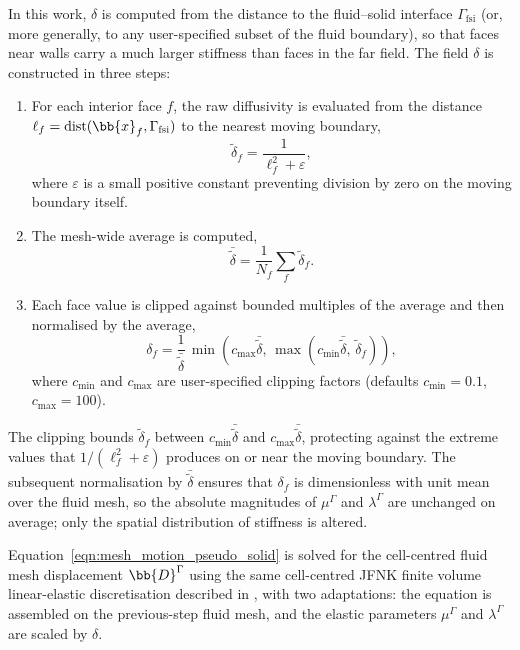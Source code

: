 In this work, $\delta$ is computed from the distance to the fluid--solid interface $\Gamma_\mathrm{fsi}$ (or, more generally, to any user-specified subset of the fluid boundary), so that faces near walls carry a much larger stiffness than faces in the far field.
The field $\delta$ is constructed in three steps:
\begin{enumerate}
    \item For each interior face $f$, the raw diffusivity is evaluated from the distance $\ell_f = \mathrm{dist}(\bb{x}_f, \Gamma_\mathrm{fsi})$ to the nearest moving boundary,
    \begin{equation}
        \tilde{\delta}_f = \frac{1}{\ell_f^2 + \varepsilon},
        \label{qm:eqn:mesh_motion_diffusivity_raw}
    \end{equation}
    where $\varepsilon$ is a small positive constant preventing division by zero on the moving boundary itself.

    \item The mesh-wide average is computed,
    \begin{equation}
        \bar{\tilde\delta} = \frac{1}{N_f}\sum_f \tilde\delta_f .
        \label{qm:eqn:delta_average}
    \end{equation}

    \item Each face value is clipped against bounded multiples of the average and then normalised by the average,
    \begin{equation}
        \delta_f = \frac{1}{\bar{\tilde\delta}}\,\min\!\left(c_\text{max}\bar{\tilde\delta},\, \max\!\left(c_\text{min}\bar{\tilde\delta},\, \tilde\delta_f\right)\right),
        \label{qm:eqn:delta_clip}
    \end{equation}
    where $c_{\min}$ and $c_{\max}$ are user-specified clipping factors (defaults $c_{\min} = 0.1$, $c_{\max} = 100$).
\end{enumerate}

The clipping bounds $\tilde\delta_f$ between $c_{\min} \bar{\tilde\delta}$ and $c_{\max} \bar{\tilde\delta}$, protecting against the extreme values that $1/(\ell_f^2 + \varepsilon)$ produces on or near the moving boundary.
The subsequent normalisation by $\bar{\tilde\delta}$ ensures that $\delta_f$ is dimensionless with unit mean over the fluid mesh, so the absolute magnitudes of $\mu^\Gamma$ and $\lambda^\Gamma$ are unchanged on average; only the spatial distribution of stiffness is altered.

Equation~\eqref{eqn:mesh_motion_pseudo_solid} is solved for the cell-centred fluid mesh displacement $\bb{D}^{\Gamma}$ using the same cell-centred JFNK finite volume linear-elastic discretisation described in \citet{Cardiff2026}, with two adaptations: the equation is assembled on the previous-step fluid mesh, and the elastic parameters $\mu^\Gamma$ and $\lambda^\Gamma$ are scaled by $\delta$.

